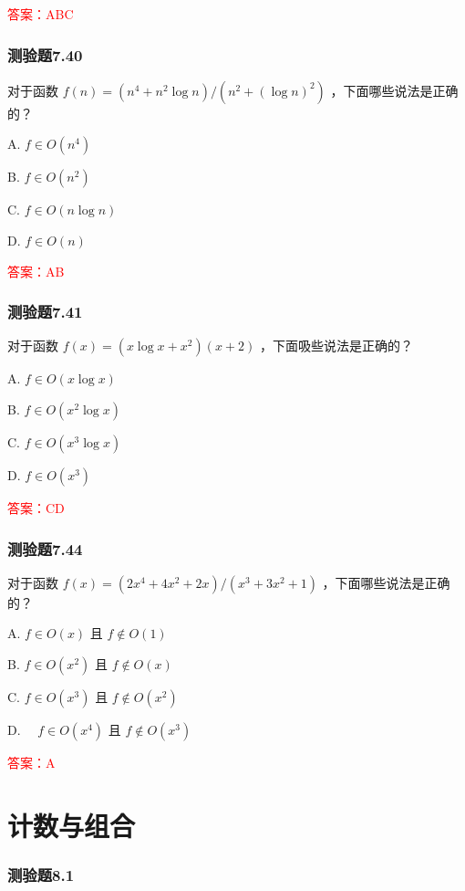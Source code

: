 \documentclass[UTF8, heading=true]{ctexart}
\begin{document}
\textcolor{red}{答案：ABC}

\subsubsection{测验题7.40}

对于函数 $f(n)=\left(n^4+n^2 \log n\right) /\left(n^2+(\log n)^2\right)$ ，下面哪些说法是正确的？

A. $ f \in O\left(n^4\right)$

B. $ f \in O\left(n^2\right)$

C. $ f \in O(n \log n)$

D. $f \in O(n)$

\textcolor{red}{答案：AB}


\subsubsection{测验题7.41}

对于函数 $f(x)=\left(x \log x+x^2\right)(x+2)$ ，下面吸些说法是正确的？

A. $ f \in O(x \log x)$

B. $f \in O\left(x^2 \log x\right)$

C. $f \in O\left(x^3 \log x\right)$

D. $ f \in O\left(x^3\right)$

\textcolor{red}{答案：CD}

\subsubsection{测验题7.44}

对于函数 $f(x)=\left(2 x^4+4 x^2+2 x\right) /\left(x^3+3 x^2+1\right)$ ，下面哪些说法是正确的？

A. $f \in O(x)$ 且 $f \notin O(1)$

B. $f \in O\left(x^2\right)$ 且 $f \notin O(x)$

C. $f \in O\left(x^3\right)$ 且 $f \notin O\left(x^2\right)$

D. $\quad f \in O\left(x^4\right)$ 且 $f \notin O\left(x^3\right)$

\textcolor{red}{答案：A}




\clearpage
\section{计数与组合}

\subsubsection{测验题8.1}
\end{document}
